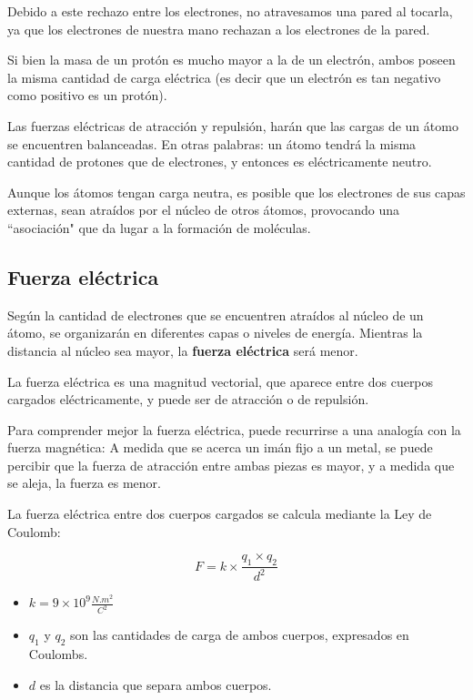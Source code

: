 Debido a este rechazo entre los electrones, no atravesamos una pared al tocarla, ya que los electrones de nuestra mano rechazan a los electrones de la pared.

Si bien la masa de un protón es mucho mayor a la de un electrón, ambos poseen la misma cantidad de carga eléctrica (es decir que un electrón es tan negativo como positivo es un protón). 

Las fuerzas eléctricas de atracción y repulsión, harán que las cargas de un átomo se encuentren balanceadas. En otras palabras: un átomo tendrá la misma cantidad de protones que de electrones, y entonces es eléctricamente neutro.

Aunque los átomos tengan carga neutra, es posible que los electrones de sus capas externas, sean atraídos por el núcleo de otros átomos, provocando una ``asociación" que da lugar a la formación de moléculas.

\subsection{Fuerza eléctrica}

Según la cantidad de electrones que se encuentren atraídos al núcleo de un átomo, se organizarán en diferentes capas o niveles de energía. Mientras la distancia al núcleo sea mayor, la \textbf{fuerza eléctrica} será menor.

La fuerza eléctrica es una magnitud vectorial, que aparece entre dos cuerpos cargados eléctricamente, y puede ser de atracción o de repulsión.

Para comprender mejor la fuerza eléctrica, puede recurrirse a una analogía con la fuerza magnética: 
A medida que se acerca un imán fijo a un metal, se puede percibir que la fuerza de atracción entre ambas piezas es mayor, y a medida que se aleja, la fuerza es menor.

La fuerza eléctrica entre dos cuerpos cargados se calcula mediante la Ley de Coulomb:

$$ F = k \times \frac{q_1 \times q_2}{d^{2}} $$

\begin{itemize}
	\item $k=9 \times 10^{9}\frac{N.m^{2}}{C^{2}}$
	\item $q_1$ y $q_2$ son las cantidades de carga de ambos cuerpos, expresados en Coulombs.
	\item $d$ es la distancia que separa ambos cuerpos.
\end{itemize}

